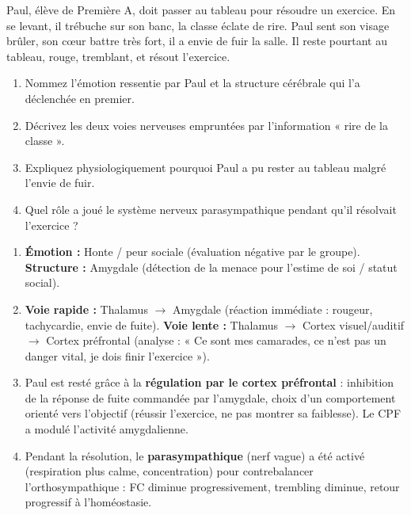 \documentclass[11pt]{article}
\begin{document}
\begin{exercice}
Paul, élève de Première A, doit passer au tableau pour résoudre un exercice. En se levant, il trébuche sur son banc, la classe éclate de rire. Paul sent son visage brûler, son cœur battre très fort, il a envie de fuir la salle. Il reste pourtant au tableau, rouge, tremblant, et résout l'exercice.
\begin{enumerate}
  \item Nommez l'émotion ressentie par Paul et la structure cérébrale qui l'a déclenchée en premier.
  \item Décrivez les deux voies nerveuses empruntées par l'information « rire de la classe ».
  \item Expliquez physiologiquement pourquoi Paul a pu rester au tableau malgré l'envie de fuir.
  \item Quel rôle a joué le système nerveux parasympathique pendant qu'il résolvait l'exercice ?
\end{enumerate}
\end{exercice}

\begin{corrige}
\begin{enumerate}
  \item \textbf{Émotion :} Honte / peur sociale (évaluation négative par le groupe). \textbf{Structure :} Amygdale (détection de la menace pour l'estime de soi / statut social).
  \item \textbf{Voie rapide :} Thalamus $\rightarrow$ Amygdale (réaction immédiate : rougeur, tachycardie, envie de fuite). \textbf{Voie lente :} Thalamus $\rightarrow$ Cortex visuel/auditif $\rightarrow$ Cortex préfrontal (analyse : « Ce sont mes camarades, ce n'est pas un danger vital, je dois finir l'exercice »).
  \item Paul est resté grâce à la \textbf{régulation par le cortex préfrontal} : inhibition de la réponse de fuite commandée par l'amygdale, choix d'un comportement orienté vers l'objectif (réussir l'exercice, ne pas montrer sa faiblesse). Le CPF a modulé l'activité amygdalienne.
  \item Pendant la résolution, le \textbf{parasympathique} (nerf vague) a été activé (respiration plus calme, concentration) pour contrebalancer l'orthosympathique : FC diminue progressivement, trembling diminue, retour progressif à l'homéostasie.
\end{enumerate}
\end{corrige}
\end{document}

